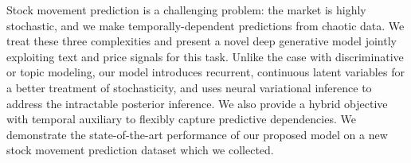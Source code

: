 Stock movement prediction is a challenging problem: the market is highly stochastic, and we make temporally-dependent predictions from chaotic data. We treat these three complexities and present a novel deep generative model jointly exploiting text and price signals for this task. Unlike the case with discriminative or topic modeling, our model introduces recurrent, continuous latent variables for a better treatment of stochasticity, and uses neural variational inference to address the intractable posterior inference. We also provide a hybrid objective with  temporal auxiliary to flexibly capture predictive dependencies. We demonstrate the state-of-the-art performance of our proposed model on a new stock movement prediction dataset which we collected.
